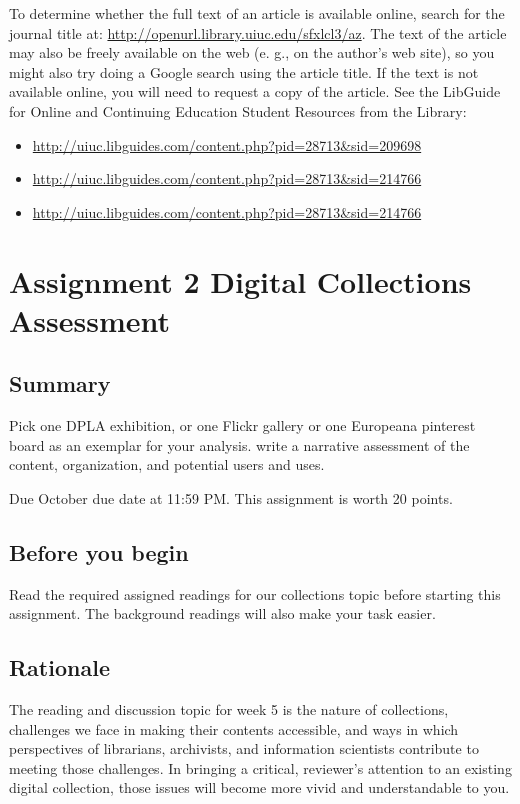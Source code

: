 \documentclass[]{article}
\providecommand{\tightlist}{%
  \setlength{\itemsep}{0pt}\setlength{\parskip}{0pt}}
\begin{document}
To determine whether the full text of an article is available online,
search for the journal title at:
\url{http://openurl.library.uiuc.edu/sfxlcl3/az}. The text of the
article may also be freely available on the web (e. g., on the author's
web site), so you might also try doing a Google search using the article
title. If the text is not available online, you will need to request a
copy of the article. See the LibGuide for Online and Continuing
Education Student Resources from the Library:

\begin{itemize}
\tightlist
\item
  \url{http://uiuc.libguides.com/content.php?pid=28713\&sid=209698}
\item
  \url{http://uiuc.libguides.com/content.php?pid=28713\&sid=214766}
\item
  \url{http://uiuc.libguides.com/content.php?pid=28713\&sid=214766}
\end{itemize}

\section{Assignment 2 Digital Collections Assessment}\label{Asgt2}

\subsection{Summary}\label{summary}

Pick one DPLA exhibition, or one Flickr gallery or one Europeana
pinterest board as an exemplar for your analysis. write a narrative
assessment of the content, organization, and potential users and uses.

Due October due date at 11:59 PM. This assignment is worth 20 points.

\subsection{Before you begin}\label{before-you-begin}

Read the required assigned readings for our collections topic before
starting this assignment. The background readings will also make your
task easier.

\subsection{Rationale}\label{rationale-1}

The reading and discussion topic for week 5 is the nature of
collections, challenges we face in making their contents accessible, and
ways in which perspectives of librarians, archivists, and information
scientists contribute to meeting those challenges. In bringing a
critical, reviewer's attention to an existing digital collection, those
issues will become more vivid and understandable to you.
\end{document}
